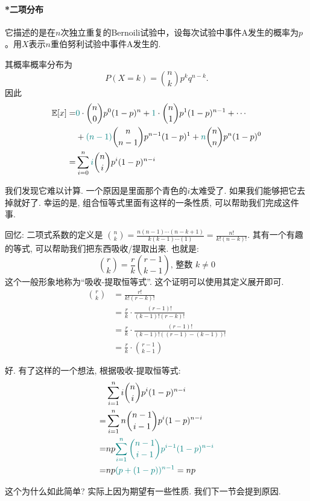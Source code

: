     \begin{shaded}
        \paragraph{*二项分布} 它描述的是在$n$次独立重复的Bernoili试验中，设每次试验中事件A发生的概率为$p$。用$X$表示$n$重伯努利试验中事件A发生的{}.

        其概率概率分布为$$P(X=k)={n\choose k} p^k q^{n-k}.$$
        因此
    $$
\begin{aligned}
\mathbb E[x]= & {{\color{teal}0}} \cdot {n \choose 0} p^0(1-p)^n+{{\color{teal}1}} \cdot\binom n1 p^1(1-p)^{n-1}+\cdots \\
& +{{\color{teal}(n-1)}}\binom n{n-1} p^{n-1}(1-p)^1  +{{\color{teal}n}}\binom nn
 p^n(1-p)^0 \\
= & \sum_{i=0}^n {{\color{teal}i}}\binom ni p^i(1-p)^{n-i}
\end{aligned}
$$

我们发现它难以计算. 一个原因是里面那个青色的$i$太难受了. 如果我们能够把它去掉就好了. 幸运的是, 组合恒等式里面有这样的一条性质, 可以帮助我们完成这件事. 

回忆: 二项式系数的定义是 $\binom nk = \frac{n(n-1) \cdots(n-k+1)}{k(k-1) \cdots(1)}=\frac{n !}{k !(n-k) !}$. 其有一个有趣的等式, 可以帮助我们把东西吸收/提取出来. 也就是: 
$$
\binom rk=\frac{r}{k}\binom{r-1}{k-1} \text {, 整数 } k \neq 0
$$
这个一般形象地称为``吸收-提取恒等式''. 这个证明可以使用其定义展开即可. 
$$
\begin{aligned}
\binom rk & =\frac{r !}{k !(r-k) !} \\
& =\frac{r}{k} \cdot \frac{(r-1) !}{(k-1) !(r-k) !} \\
& =\frac{r}{k} \cdot \frac{(r-1) !}{(k-1) !((r-1)-(k-1)) !} \\
& =\frac{r}{k} \cdot \binom {r-1}{k-1}
\end{aligned}
$$


好. 有了这样的一个想法,  根据吸收-提取恒等式:
$$
\begin{aligned}
& \sum_{i=1}^n i\binom ni p^i(1-p)^{n-i} \\
= & \sum_{i=1}^n n\binom{n-1}{i-1} p^i(1-p)^{n-i} \\
= & n p {{\color{teal}\sum_{i=1}^n\binom{n-1}{i-1} p^{i-1}(1-p)^{n-i}}} \\
= & n p{{\color{teal}(p+(1-p))^{n-1}}}=n p
\end{aligned}
$$

这个为什么如此简单? 实际上因为期望有一些性质. 我们下一节会提到原因. 
    \end{shaded}

